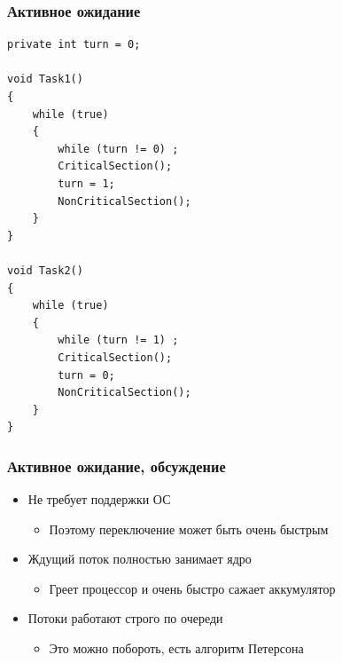 \documentclass{../../slides-style}
\begin{document}
    \begin{frame}[fragile]
        \frametitle{Активное ожидание}
        \begin{scriptsize}
            \begin{verbatim}
private int turn = 0;

void Task1()
{
    while (true)
    {
        while (turn != 0) ;
        CriticalSection();
        turn = 1;
        NonCriticalSection();
    }
}

void Task2()
{
    while (true)
    {
        while (turn != 1) ;
        CriticalSection();
        turn = 0;
        NonCriticalSection();
    }
}
            \end{verbatim}
        \end{scriptsize}
    \end{frame}

    \begin{frame}
        \frametitle{Активное ожидание, обсуждение}
        \begin{itemize}
            \item Не требует поддержки ОС
            \begin{itemize}
                \item Поэтому переключение может быть очень быстрым
            \end{itemize}
            \item Ждущий поток полностью занимает ядро
            \begin{itemize}
                \item Греет процессор и очень быстро сажает аккумулятор
            \end{itemize}
            \item Потоки работают строго по очереди
            \begin{itemize}
                \item Это можно побороть, есть алгоритм Петерсона
            \end{itemize}
        \end{itemize}
    \end{frame}
\end{document}
